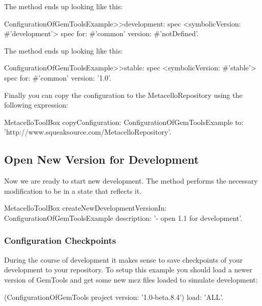 \documentclass[a4paper,10pt,twoside]{book}
\begin{document}
The  method ends up looking like this:

\begin{code}{}
ConfigurationOfGemToolsExample>>development: spec
  <symbolicVersion: #'development'>
  spec for: #'common' version: #'notDefined'.
\end{code}  
  
The  method ends up looking like this:

\begin{code}{}
ConfigurationOfGemToolsExample>>stable: spec
  <symbolicVersion: #'stable'>
  spec for: #'common' version: '1.0'.
\end{code}  
  
Finally you can copy the configuration to the MetacelloRepository using the following expression:

\begin{code}{}
  MetacelloToolBox
    copyConfiguration: ConfigurationOfGemToolsExample
    to: 'http://www.squeaksource.com/MetacelloRepository'.
\end{code}


\subsection{Open New Version for Development}

Now we are ready to start new development. The method 
performs the necessary modification to be in a state that reflects it. 


\begin{code}{}
MetacelloToolBox
  createNewDevelopmentVersionIn: ConfigurationOfGemToolsExample
  description: '- open 1.1 for development'.
\end{code}

\subsubsection{Configuration Checkpoints}

During the course of development it makes sense to save checkpoints of your development to your repository. To setup this example you should load a newer version of GemTools and get some new mcz files loaded to simulate development:

\begin{code}{}
(ConfigurationOfGemTools project version: '1.0-beta.8.4')
  load: 'ALL'.
\end{code}  
\end{document}
